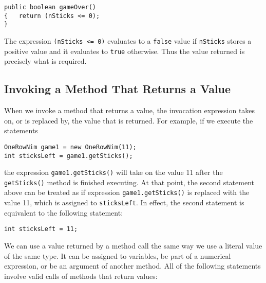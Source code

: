 \begin{jjjlisting}
\begin{lstlisting}
public boolean gameOver()
{   return (nSticks <= 0);
}
\end{lstlisting}
\end{jjjlisting}

\noindent The expression {\tt (nSticks <= 0)} evaluates to a {\tt false} 
value if {\tt nSticks} stores a positive value and it evaluates to
{\tt true} otherwise.  Thus the value returned is precisely what is
required.

\subsection{Invoking a Method That Returns a Value}

\noindent When we invoke a method that returns a value, the invocation
expression takes on, or is replaced by, the value that is returned.
For example, if we execute the statements

\begin{jjjlisting}
\begin{lstlisting}
OneRowNim game1 = new OneRowNim(11);
int sticksLeft = game1.getSticks();
\end{lstlisting}
\end{jjjlisting}

\noindent the expression {\tt game1.getSticks()} will take
on the value 11 after the {\tt getSticks()} method is finished
executing.  At that point, the second statement above can be treated
as if expression \mbox{\tt game1.getSticks()} is replaced with the
value 11, which is assigned to {\tt sticksLeft}. In effect, the
second statement is equivalent to the following statement:

\begin{jjjlisting}
\begin{lstlisting}
int sticksLeft = 11;
\end{lstlisting}
\end{jjjlisting}



We can use a value returned by a method call the same way we use a
literal value of the same type.  It can be assigned to variables, be
part of a numerical expression, or be an argument of another
method. All of the following statements involve valid calls of methods
that return values:

